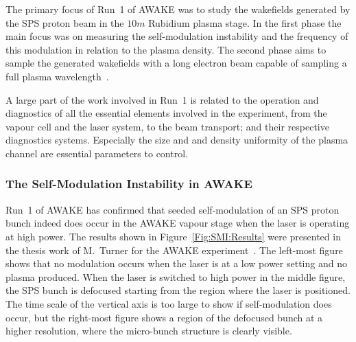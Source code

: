 The primary focus of Run~1 of AWAKE was to study the wakefields generated by the SPS proton beam in the $10\unit{m}$ Rubidium plasma stage.
In the first phase the main focus was on measuring the self-modulation instability and the frequency of this modulation in relation to the plasma density.
The second phase aims to sample the generated wakefields with a long electron beam capable of sampling a full plasma wavelength~\cite{adli:2016a}.

A large part of the work involved in Run~1 is related to the operation and diagnostics of all the essential elements involved in the experiment, from the vapour cell and the laser system, to the beam transport; and their respective diagnostics systems.
Especially the size and and density uniformity of the plasma channel are essential parameters to control.

\subsubsection{The Self-Modulation Instability in AWAKE}
\label{WFA:SMI}

Run~1 of AWAKE has confirmed that seeded self-modulation of an SPS proton bunch indeed does occur in the AWAKE vapour stage when the laser is operating at high power.
The results shown in Figure~\ref{Fig:SMI:Results} were presented in the thesis work of M.~Turner for the AWAKE experiment~\cite{turner:2017}.
The left-most figure shows that no modulation occurs when the laser is at a low power setting and no plasma produced.
When the laser is switched to high power in the middle figure, the SPS bunch is defocused starting from the region where the laser is positioned.
The time scale of the vertical axis is too large to show if self-modulation does occur, but the right-most figure shows a region of the defocused bunch at a higher resolution, where the micro-bunch structure is clearly visible.

